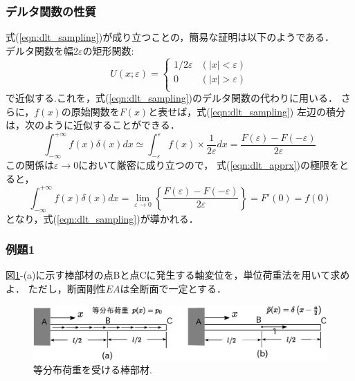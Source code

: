\documentclass[10pt,a4j]{jarticle}
\begin{document}
\subsubsection{デルタ関数の性質}
式(\ref{eqn:dlt_sampling})が成り立つことの，簡易な証明は以下のようである．\\

デルタ関数を幅$2\varepsilon$の矩形関数:
\begin{equation}
	U(x;\varepsilon)=\left\{
	\begin{array}{cc}
		1/2\varepsilon & (|x|<\varepsilon) \\
		0 & (|x|>\varepsilon) \\
	\end{array}
	\right.
	\label{eqn:rec_fun}
\end{equation}
で近似する.これを，式(\ref{eqn:dlt_sampling})のデルタ関数の代わりに用いる．
さらに，$f(x)$の原始関数を$F(x)$と表せば，式(\ref{eqn:dlt_sampling})
左辺の積分は，次のように近似することができる．
\begin{equation}
	\int_{-\infty}^{+\infty} f(x) \delta(x)dx 
	\simeq 
	\int_{-\varepsilon}^{\varepsilon} f(x) \times \frac{1}{2\varepsilon}dx 
	=\frac{F(\varepsilon)-F(-\varepsilon)}{2\varepsilon}
	\label{eqn:dlt_apprx}
\end{equation}
この関係は$\varepsilon \rightarrow 0$において厳密に成り立つので，
式(\ref{eqn:dlt_apprx})の極限をとると，
\begin{equation}
	\int_{-\infty}^{+\infty} f(x) \delta(x)dx 
	=
	\lim_{\varepsilon \rightarrow 0} 
	\left\{
	\frac{F(\varepsilon)-F(-\varepsilon)}{2\varepsilon}
	\right\}
	=F'(0)=f(0)
	\label{eqn:}
\end{equation}
となり，式(\ref{eqn:dlt_sampling})が導かれる．
%
\newpage
\subsubsection{例題1}
図\ref{fig:fig1_4}-(a)に示す棒部材の点Bと点Cに発生する軸変位を，単位荷重法を用いて求めよ．
ただし，断面剛性$EA$は全断面で一定とする．
\begin{figure}[h]
	\begin{center}
	\includegraphics[width=0.4\linewidth]{fig1_4.eps} 
	\end{center}
	\caption{等分布荷重を受ける棒部材.}
	\label{fig:fig1_4}
\end{figure}
\end{document}
